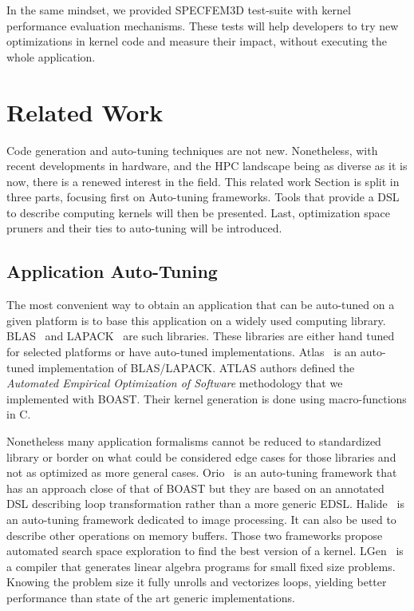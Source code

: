 \documentclass{IEEEtran}
\begin{document}
In the same mindset, we provided SPECFEM3D test-suite with kernel
performance evaluation mechanisms. These tests will help developers to
try new optimizations in kernel code and measure their impact, without
executing the whole application.

\section{Related Work\label{sec:related}}

Code generation and auto-tuning techniques are not new. Nonetheless, with recent
developments in hardware, and the HPC landscape being as diverse as it is now,
there is a renewed interest in the field. This related work Section is split in
three parts, focusing first on Auto-tuning frameworks. Tools that provide a DSL
to describe computing kernels will then be presented. Last, optimization space
pruners and their ties to auto-tuning will be introduced.

  \subsection{Application Auto-Tuning} 

  The most convenient way to obtain an application that can be auto-tuned on a
given platform is to base this application on a widely used computing library.
BLAS~\cite{dongarra1990set} and LAPACK~\cite{laug} are such libraries. These
libraries are either hand tuned for selected platforms or have auto-tuned
implementations. Atlas~\cite{whaley04} is an auto-tuned implementation of
BLAS/LAPACK. ATLAS authors defined the \emph{Automated Empirical Optimization of
Software} methodology that we implemented with BOAST. Their kernel generation is
done using macro-functions in C.

  Nonetheless many application formalisms cannot be reduced to standardized
library or border on what could be considered edge cases for those libraries and
not as optimized as more general cases. Orio~\cite{Hart2009:Orio} is an
auto-tuning framework that has an approach close of that of BOAST but they are
based on an annotated DSL describing loop transformation rather than a more
generic EDSL. Halide~\cite{ragan2013halide} is an auto-tuning framework
dedicated to image processing. It can also be used to describe other
operations on memory buffers. Those two frameworks propose automated search
space exploration to find the best version of a kernel.
LGen~\cite{spampinato2014basic} is a compiler that generates linear algebra
programs for small fixed size problems. Knowing the problem size it fully
unrolls and vectorizes loops, yielding better performance than state of the
art generic implementations.
\end{document}
